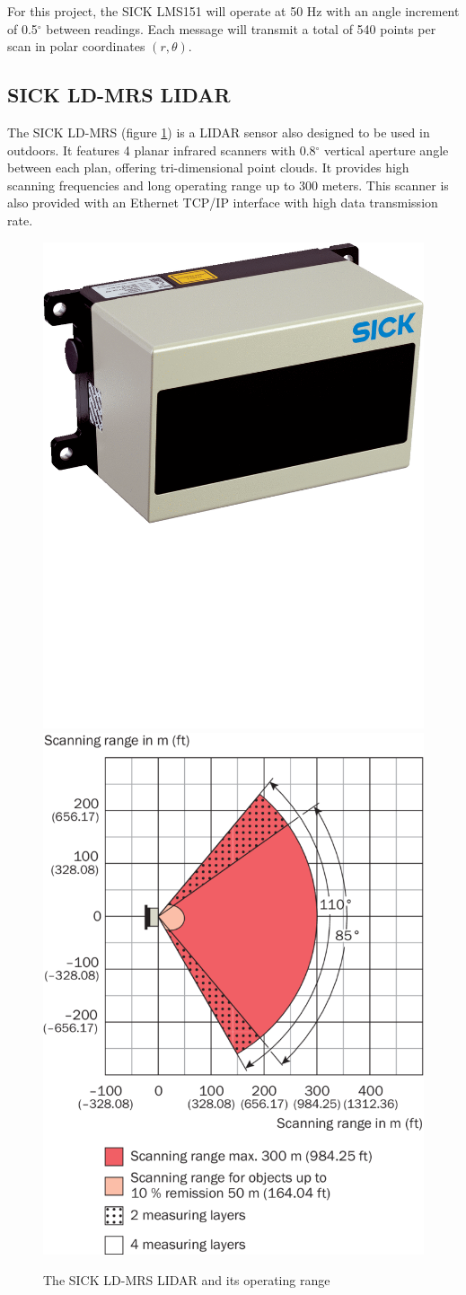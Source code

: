 For this project, the SICK LMS151 will operate at 50 Hz with an angle increment of 0.5$^{\circ}$ between readings. Each message will transmit a total of 540 points per scan in polar coordinates $(r,\theta)$. \cite{SICK}

\subsection{SICK LD-MRS LIDAR}

The SICK LD-MRS (figure \ref{fig:sickldmrs}) is a LIDAR sensor also designed to be used in outdoors. It features 4 planar infrared scanners with 0.8$^{\circ}$ vertical aperture angle between each plan, offering tri-dimensional point clouds. It provides high scanning frequencies and long operating range up to 300 meters. This scanner is also provided with an Ethernet TCP/IP interface with high data transmission rate. \cite{SICKa}

\begin{figure}[htp]
	
	\centering
	\hfill
	\includegraphics[width=.4\textwidth]{capexp/imgs/sickldmrs}\hfill
	\includegraphics[width=.5\textwidth]{capexp/imgs/sickldmrs2}\hfill
	
	\caption{The SICK LD-MRS LIDAR and its operating range}
	\label{fig:sickldmrs}
	
\end{figure}

